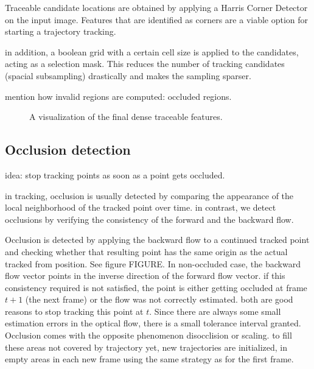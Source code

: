 Traceable candidate locations are obtained by applying a Harris Corner Detector on the input image. 
Features that are identified as corners are a viable option for starting a trajectory tracking.

in addition, a boolean grid with a certain cell size is applied to the candidates, acting as a selection mask. This reduces the number of tracking candidates (spacial subsampling) drastically and makes the sampling sparser.


mention how invalid regions are computed: occluded regions.

\begin{figure}[H]
\begin{center}
\end{center}
\caption[Strict Dense Candidates]{A visualization of the final dense traceable features.}
\label{fig:tracable_candidates_strict}
\end{figure}







\subsection{Occlusion detection}
idea: stop tracking points as soon as a point gets occluded.

in tracking, occlusion is usually detected by comparing the appearance of the local neighborhood of the tracked point over time. in contrast, we detect occlusions by verifying the consistency of the forward and the backward flow.

Occlusion is detected by applying the backward flow to a continued tracked point and checking whether that resulting point has the same origin as the actual tracked from position. See figure FIGURE. In non-occluded case, the backward flow vector points in the inverse direction of the forward flow vector. if this consistency required is not satisfied, the point is either getting occluded at frame $t+1$ (the next frame) or the flow was not correctly estimated. both are good reasons to stop tracking this point at $t$. Since there are always some small estimation errors in the optical flow, there is a small tolerance interval granted.
Occlusion comes with the opposite phenomenon disocclision or scaling. to fill these areas not covered by trajectory yet, new trajectories are initialized, in empty areas in each new frame using the same strategy as for the first frame.

